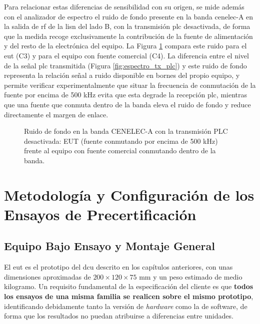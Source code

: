 Para relacionar estas diferencias de sensibilidad con su origen, se mide además con el analizador de espectro el ruido de fondo presente en la banda \gls{cenelec}-A en la salida de \gls{rf} de la \gls{lisn} del lado B, con la transmisión \gls{plc} desactivada, de forma que la medida recoge exclusivamente la contribución de la fuente de alimentación y del resto de la electrónica del equipo. La Figura \ref{fig:ruido_banda_eut_vs_comercial} compara este ruido para el \gls{eut} (C3) y para el equipo con fuente comercial (C4). La diferencia entre el nivel de la señal \gls{plc} transmitida (Figura \ref{fig:espectro_tx_plc}) y este ruido de fondo representa la relación señal a ruido disponible en bornes del propio equipo, y permite verificar experimentalmente que situar la frecuencia de conmutación de la fuente por encima de 500 kHz evita que esta degrade la recepción \gls{plc}, mientras que una fuente que conmuta dentro de la banda eleva el ruido de fondo y reduce directamente el margen de enlace.

\begin{figure}[htbp]
    \centering
    \caption{Ruido de fondo en la banda CENELEC-A con la transmisión PLC desactivada: EUT (fuente conmutando por encima de 500 kHz) frente al equipo con fuente comercial conmutando dentro de la banda.}
    \label{fig:ruido_banda_eut_vs_comercial}
\end{figure}


\section{Metodología y Configuración de los Ensayos de Precertificación}
\label{sec:metodologia_ensayos}

\subsection{Equipo Bajo Ensayo y Montaje General}
\label{subsec:eut_montaje}

El \gls{eut} es el prototipo del \gls{dcu} descrito en los capítulos anteriores, con unas dimensiones aproximadas de $200 \times 120 \times 75$ mm y un peso estimado de medio kilogramo. Un requisito fundamental de la especificación del cliente es que \textbf{todos los ensayos de una misma familia se realicen sobre el mismo prototipo}, identificando debidamente tanto la versión de \textit{hardware} como la de software, de forma que los resultados no puedan atribuirse a diferencias entre unidades.


